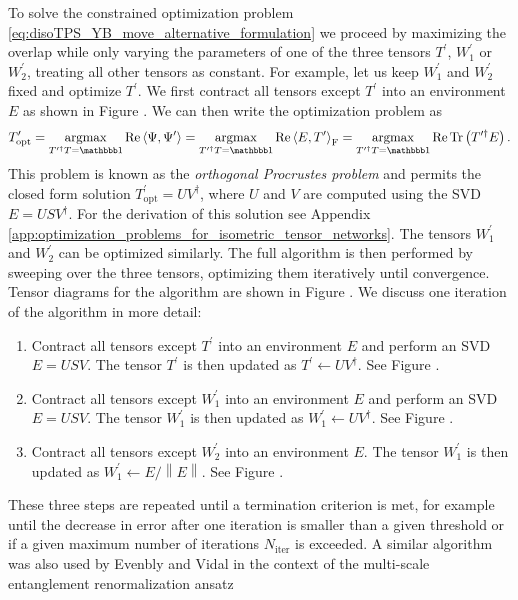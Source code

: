 To solve the constrained optimization problem \eqref{eq:disoTPS_YB_move_alternative_formulation} we proceed by maximizing the overlap while only varying the parameters of one of the three tensors $T^\prime$, $W_1^\prime$ or $W_2^\prime$, treating all other tensors as constant. For example, let us keep $W_1^\prime$ and $W_2^\prime$ fixed and optimize $T^\prime$. We first contract all tensors except $T^\prime$ into an environment $E$ as shown in Figure . We can then write the optimization problem as
\begin{equation}
	T^\prime_\text{opt} = \underset{T^{\prime\dagger}T = \id}{\argmax} \Re\braket{\Psi,\Psi^\prime} = \underset{T^{\prime\dagger}T = \id}{\argmax}\Re\left\langle E, T^\prime\right\rangle_\text{F} = \underset{T^{\prime\dagger}T = \id}{\argmax}\Re\Tr\left(T^{\prime\dagger}E\right).
\end{equation}
This problem is known as the \textit{orthogonal Procrustes problem} and permits the closed form solution $T^\prime_\text{opt} = UV^\dagger$, where $U$ and $V$ are computed using the SVD $E = USV^\dagger$. For the derivation of this solution see Appendix \ref{app:optimization_problems_for_isometric_tensor_networks}. The tensors $W_1^\prime$ and $W_2^\prime$ can be optimized similarly. The full algorithm is then performed by sweeping over the three tensors, optimizing them iteratively until convergence. Tensor diagrams for the algorithm are shown in Figure . We discuss one iteration of the algorithm in more detail:
\begin{enumerate}
	\item Contract all tensors except $T^\prime$ into an environment $E$ and perform an SVD $E = USV$. The tensor $T^\prime$ is then updated as $T^\prime\leftarrow UV^\dagger$. See Figure .
	\item Contract all tensors except $W_1^\prime$ into an environment $E$ and perform an SVD $E = USV$. The tensor $W_1^\prime$ is then updated as $W_1^\prime\leftarrow UV^\dagger$. See Figure .
	\item Contract all tensors except $W_2^\prime$ into an environment $E$. The tensor $W_1^\prime$ is then updated as $W_1^\prime\leftarrow E/\left\lVert E\right\rVert$. See Figure .
\end{enumerate}
These three steps are repeated until a termination criterion is met, for example until the decrease in error after one iteration is smaller than a given threshold or if a given maximum number of iterations $N_\text{iter}$ is exceeded. A similar algorithm was also used by Evenbly and Vidal in the context of the multi-scale entanglement renormalization ansatz

